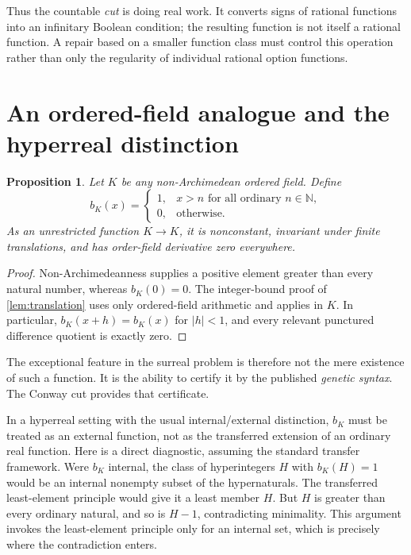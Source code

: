 \documentclass[11pt,letterpaper]{article}
\numberwithin{equation}{section}
\newtheorem{proposition}[theorem]{Proposition}
\theoremstyle{definition}
\theoremstyle{remark}
\newcommand{\N}{\mathbb{N}}
\begin{document}
Thus the countable \emph{cut} is doing real work. It converts signs of
rational functions into an infinitary Boolean condition; the resulting
function is not itself a rational function. A repair based on a smaller
function class must control this operation rather than only the
regularity of individual rational option functions.

\section{An ordered-field analogue and the hyperreal distinction}\label{sec:hyperreal}
\begin{proposition}\label{prop:field}
Let $K$ be any non-Archimedean ordered field. Define
\[
 b_K(x)=\begin{cases}
 1,&x>n\text{ for all ordinary }n\in\N,\\
 0,&\text{otherwise}.
 \end{cases}
\]
As an unrestricted function $K\to K$, it is nonconstant, invariant under
finite translations, and has order-field derivative zero everywhere.
\end{proposition}
\begin{proof}
Non-Archimedeanness supplies a positive element greater than every natural
number, whereas $b_K(0)=0$. The integer-bound proof of
\cref{lem:translation} uses only ordered-field arithmetic and applies in
$K$. In particular, $b_K(x+h)=b_K(x)$ for $|h|<1$, and every relevant
punctured difference quotient is exactly zero.
\end{proof}

The exceptional feature in the surreal problem is therefore not the mere
existence of such a function. It is the ability to certify it by the
published \emph{genetic syntax}. The Conway cut provides that certificate.

In a hyperreal setting with the usual internal/external distinction,
$b_K$ must be treated as an external function, not as the transferred
extension of an ordinary real function. Here is a direct diagnostic,
assuming the standard transfer framework. Were $b_K$ internal, the class
of hyperintegers $H$ with $b_K(H)=1$ would be an internal nonempty subset
of the hypernaturals. The transferred least-element principle would give
it a least member $H$. But $H$ is greater than every ordinary natural, and
so is $H-1$, contradicting minimality. This argument invokes the
least-element principle only for an internal set, which is precisely
where the contradiction enters.
\end{document}
